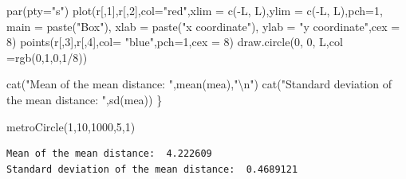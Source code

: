 \documentclass[11pt]{article}
\newenvironment{Shaded}{}{}
\newcommand{\DecValTok}[1]{\textcolor[rgb]{0.25,0.63,0.44}{{#1}}}
\newcommand{\StringTok}[1]{\textcolor[rgb]{0.25,0.44,0.63}{{#1}}}
\newcommand{\FunctionTok}[1]{\textcolor[rgb]{0.02,0.16,0.49}{{#1}}}
\newcommand{\NormalTok}[1]{{#1}}
\newcommand{\SpecialCharTok}[1]{\textcolor[rgb]{0.25,0.44,0.63}{{#1}}}
\newcommand{\AttributeTok}[1]{\textcolor[rgb]{0.49,0.56,0.16}{{#1}}}
\begin{document}
\begin{Shaded}
\begin{Highlighting}[]
    \FunctionTok{par}\NormalTok{(}\AttributeTok{pty=}\StringTok{"s"}\NormalTok{)}
    \FunctionTok{plot}\NormalTok{(r[,}\DecValTok{1}\NormalTok{],r[,}\DecValTok{2}\NormalTok{],}\AttributeTok{col=}\StringTok{"red"}\NormalTok{,}\AttributeTok{xlim =} \FunctionTok{c}\NormalTok{(}\SpecialCharTok{{-}}\NormalTok{L, L),}\AttributeTok{ylim =} \FunctionTok{c}\NormalTok{(}\SpecialCharTok{{-}}\NormalTok{L, L),}\AttributeTok{pch=}\DecValTok{1}\NormalTok{,}
         \AttributeTok{main =} \FunctionTok{paste}\NormalTok{(}\StringTok{"Box"}\NormalTok{),}
         \AttributeTok{xlab =} \FunctionTok{paste}\NormalTok{(}\StringTok{"x coordinate"}\NormalTok{), }\AttributeTok{ylab =} \StringTok{"y coordinate"}\NormalTok{,}\AttributeTok{cex =} \DecValTok{8}\NormalTok{)}
    \FunctionTok{points}\NormalTok{(r[,}\DecValTok{3}\NormalTok{],r[,}\DecValTok{4}\NormalTok{],}\AttributeTok{col=} \StringTok{"blue"}\NormalTok{,}\AttributeTok{pch=}\DecValTok{1}\NormalTok{,}\AttributeTok{cex =} \DecValTok{8}\NormalTok{)}
    \FunctionTok{draw.circle}\NormalTok{(}\DecValTok{0}\NormalTok{, }\DecValTok{0}\NormalTok{, L,}\AttributeTok{col =}\FunctionTok{rgb}\NormalTok{(}\DecValTok{0}\NormalTok{,}\DecValTok{1}\NormalTok{,}\DecValTok{0}\NormalTok{,}\DecValTok{1}\SpecialCharTok{/}\DecValTok{8}\NormalTok{))}
    
    \FunctionTok{cat}\NormalTok{(}\StringTok{"Mean of the mean distance: "}\NormalTok{,}\FunctionTok{mean}\NormalTok{(mea),}\StringTok{"}\SpecialCharTok{\textbackslash{}n}\StringTok{"}\NormalTok{)}
    \FunctionTok{cat}\NormalTok{(}\StringTok{"Standard deviation of the mean distance: "}\NormalTok{,}\FunctionTok{sd}\NormalTok{(mea))}
\NormalTok{\}}
\end{Highlighting}
\end{Shaded}

\begin{Shaded}
\begin{Highlighting}[]
\FunctionTok{metroCircle}\NormalTok{(}\DecValTok{1}\NormalTok{,}\DecValTok{10}\NormalTok{,}\DecValTok{1000}\NormalTok{,}\DecValTok{5}\NormalTok{,}\DecValTok{1}\NormalTok{)}
\end{Highlighting}
\end{Shaded}

\begin{verbatim}
Mean of the mean distance:  4.222609 
Standard deviation of the mean distance:  0.4689121
\end{verbatim}
\end{document}
